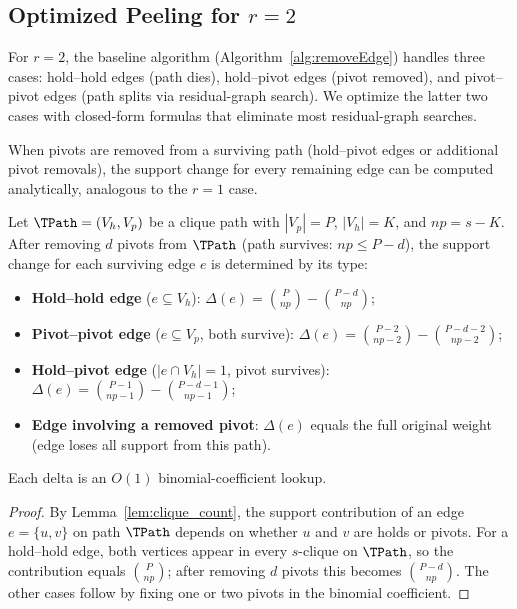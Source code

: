 
\subsection{Optimized Peeling for $r=2$}
\label{sec:opt_r2}

For $r=2$, the baseline algorithm (Algorithm~\ref{alg:removeEdge}) handles three cases:
hold--hold edges (path dies), hold--pivot edges (pivot removed), and pivot--pivot edges (path splits via residual-graph search).
We optimize the latter two cases with closed-form formulas that eliminate most residual-graph searches.

When pivots are removed from a surviving path (hold--pivot edges or additional pivot removals), the support change for every remaining edge can be computed analytically, analogous to the $r=1$ case.

\begin{theorem}\label{thm:r2_pivot_delta}
Let $\TPath = (V_h, V_p)$ be a clique path with $|V_p| = P$, $|V_h| = K$, and $\mathit{np} = s - K$.
After removing $d$ pivots from $\TPath$ (path survives: $\mathit{np} \le P - d$), the support change for each surviving edge $e$ is determined by its type:
\begin{itemize}[leftmargin=*]
\item \textbf{Hold--hold edge} ($e \subseteq V_h$): \quad $\Delta(e) = \binom{P}{np} - \binom{P-d}{np}$;
\item \textbf{Pivot--pivot edge} ($e \subseteq V_p$, both survive): \quad $\Delta(e) = \binom{P-2}{np-2} - \binom{P-d-2}{np-2}$;
\item \textbf{Hold--pivot edge} ($|e \cap V_h|=1$, pivot survives): \quad $\Delta(e) = \binom{P-1}{np-1} - \binom{P-d-1}{np-1}$;
\item \textbf{Edge involving a removed pivot}: \quad $\Delta(e)$ equals the full original weight (edge loses all support from this path).
\end{itemize}
Each delta is an $O(1)$ binomial-coefficient lookup.
\end{theorem}

\begin{proof}
By Lemma~\ref{lem:clique_count}, the support contribution of an edge $e = \{u,v\}$ on path $\TPath$ depends on whether $u$ and $v$ are holds or pivots.
For a hold--hold edge, both vertices appear in every $s$-clique on $\TPath$, so the contribution equals $\binom{P}{np}$; after removing $d$ pivots this becomes $\binom{P-d}{np}$.
The other cases follow by fixing one or two pivots in the binomial coefficient.
\end{proof}


